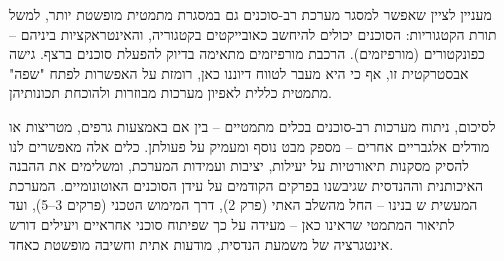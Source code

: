 מעניין לציין שאפשר למסגר מערכת רב-סוכנים גם במסגרת מתמטית מופשטת יותר, למשל תורת הקטגוריות: הסוכנים יכולים להיחשב כאובייקטים בקטגוריה, והאינטראקציות ביניהם – כפונקטורים (מורפיזמים). הרכבת מורפיזמים מתאימה בדיוק להפעלת סוכנים ברצף. גישה אבסטרקטית זו, אף כי היא מעבר לטווח דיוננו כאן, רומזת על האפשרות לפתח "שפה" מתמטית כללית לאפיון מערכות  מבוזרות ולהוכחת תכונותיהן.

לסיכום, ניתוח מערכות רב-סוכנים בכלים מתמטיים – בין אם באמצעות גרפים, מטריצות או מודלים אלגבריים אחרים – מספק מבט נוסף ומעמיק על פעולתן. כלים אלה מאפשרים לנו להסיק מסקנות תיאורטיות על יעילות, יציבות ועמידות המערכת, ומשלימים את ההבנה האיכותנית וההנדסית שגיבשנו בפרקים הקודמים על עידן הסוכנים האוטונומיים. המערכת המעשית ש בנינו – החל מהשלב האתי (פרק \num{2}), דרך המימוש הטכני (פרקים \num{3}–\num{5}), ועד לתיאור המתמטי שראינו כאן – מעידה על כך שפיתוח סוכני  אחראיים ויעילים דורש אינטגרציה של משמעת הנדסית, מודעות אתית וחשיבה מופשטת כאחד.
